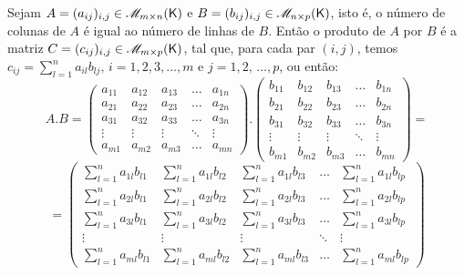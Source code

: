 \documentclass[10pt,a4paper]{book}
\begin{document}
\begin{definition} 
	Sejam $A = (a_{ij})_{i,j} \in \mathscr{ M }_{m \times n}(\mathsf{ K })$ e $B = (b_{ij})_{i,j} \in \mathscr{ M }_{n \times p}(\mathsf{ K })$, isto é, o número de colunas de $A$ é igual ao número de linhas de $B$. Então o produto de $A$ por $B$ é a matriz $C  = (c_{ij})_{i,j} \in \mathscr{ M }_{m \times p}(\mathsf{ K })$, tal que, para cada par $(i, j)$, temos $c_{ij} = \displaystyle \sum_{l = 1}^n a_{il}b_{lj}, \, i = 1, 2, 3, \dots, m \text{ e } j = 1, 2, \, \dots, p$, ou então:
	\[
		A . B = 
		\left(\begin{array}{ccccc}
			a_{11} & a_{12} & a_{13} &  \dots & a_{1n} \\
			a_{21} & a_{22} & a_{23} &  \dots & a_{2n} \\
			a_{31} & a_{32} & a_{33} &  \dots & a_{3n} \\
			\vdots & \vdots & \vdots & \ddots & \vdots \\
			a_{m1} & a_{m2} & a_{m3} &  \dots & a_{mn} 
		\end{array}\right)
		.
		\left(\begin{array}{ccccc}
			b_{11} & b_{12} & b_{13} &  \dots & b_{1n} \\
			b_{21} & b_{22} & b_{23} &  \dots & b_{2n} \\
			b_{31} & b_{32} & b_{33} &  \dots & b_{3n} \\
			\vdots & \vdots & \vdots & \ddots & \vdots \\
			b_{m1} & b_{m2} & b_{m3} &  \dots & b_{mn} 
		\end{array}\right)
		=
	\]
	\[
		= \left(\begin{array}{ccccc}
			\displaystyle \sum_{l = 1}^n a_{1l}b_{l1} & \displaystyle \sum_{l = 1}^n a_{1l}b_{l2} & \displaystyle \sum_{l = 1}^n a_{1l}b_{l3} &  \dots & \displaystyle \sum_{l = 1}^n a_{1l}b_{lp} \\ [1.5em]
			\displaystyle \sum_{l = 1}^n a_{2l}b_{l1} & \displaystyle \sum_{l = 1}^n a_{2l}b_{l2} & \displaystyle \sum_{l = 1}^n a_{2l}b_{l3} &  \dots & \displaystyle \sum_{l = 1}^n a_{2l}b_{lp} \\ [1.5em]
			\displaystyle \sum_{l = 1}^n a_{3l}b_{l1} & \displaystyle \sum_{l = 1}^n a_{3l}b_{l2} & \displaystyle \sum_{l = 1}^n a_{3l}b_{l3} &  \dots & \displaystyle \sum_{l = 1}^n a_{3l}b_{lp} \\ [1.5em]
			\vdots                                    & \vdots                                    & \vdots                                    & \ddots & \vdots                \\ 
			\displaystyle \sum_{l = 1}^n a_{ml}b_{l1} & \displaystyle \sum_{l = 1}^n a_{ml}b_{l2} & \displaystyle \sum_{l = 1}^n a_{ml}b_{l3} &  \dots & \displaystyle \sum_{l = 1}^n a_{ml}b_{lp} 
		\end{array}\right)
	\]
\end{definition}
\end{document}
